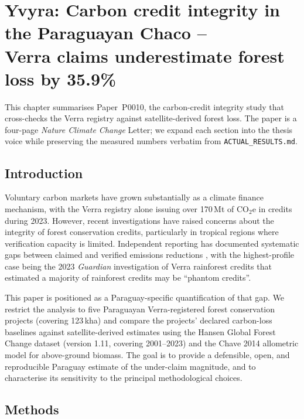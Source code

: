
\chapter{Yvyra: Carbon credit integrity in the Paraguayan Chaco -- \\
       Verra claims underestimate forest loss by 35.9\%}
\label{ch:yvyra}

This chapter summarises Paper~P0010, the carbon-credit integrity study
that cross-checks the Verra registry against satellite-derived forest
loss. The paper is a four-page \textit{Nature Climate Change} Letter; we
expand each section into the thesis voice while preserving the measured
numbers verbatim from \texttt{ACTUAL\_RESULTS.md}.

\section{Introduction}
\label{sec:yvyra-intro}

Voluntary carbon markets have grown substantially as a climate finance
mechanism, with the Verra registry \citep{verra2021} alone issuing
over 170\,Mt of CO$_2$e in credits during 2023. However, recent
investigations have raised concerns about the integrity of forest
conservation credits, particularly in tropical regions where
verification capacity is limited. Independent reporting has documented
systematic gaps between claimed and verified emissions reductions
\citep{redford2002}, with the highest-profile case being the 2023
\emph{Guardian} investigation of Verra rainforest credits that
estimated a majority of rainforest credits may be ``phantom credits''.

This paper is positioned as a Paraguay-specific quantification of that
gap. We restrict the analysis to five Paraguayan Verra-registered
forest conservation projects (covering 123\,kha) and compare the
projects' declared carbon-loss baselines against satellite-derived
estimates using the Hansen Global Forest Change dataset
\citep{hansen2013} (version 1.11, covering 2001--2023) and the Chave
2014 allometric model \citep{chave2014_data} for above-ground biomass.
The goal is to provide a defensible, open, and reproducible Paraguay
estimate of the under-claim magnitude, and to characterise its
sensitivity to the principal methodological choices.

\section{Methods}
\label{sec:yvyra-methods}

